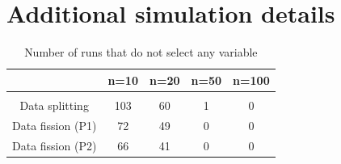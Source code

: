 \section{Additional simulation details}\label{apdx:plots}
\begin{table}[H]
\centering
\caption{Number of runs that do not select any variable}
\label{tab:num_none}
\begin{tabular}{ccccc}
                  & n=10  & n=20 & n=50 & n=100 \\
                  \hline\\
Data splitting    & 103 & 60 & 1  & 0   \\
Data fission (P1) & 72  & 49 & 0  & 0   \\
Data fission (P2) & 66  & 41 & 0  & 0  
\end{tabular}
\end{table}

